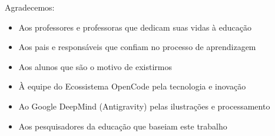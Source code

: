 \documentclass{alfabetizar}
\begin{document}
Agradecemos:
\begin{itemize}[leftmargin=2cm]
  \item Aos professores e professoras que dedicam suas vidas à educação
  \item Aos pais e responsáveis que confiam no processo de aprendizagem
  \item Aos alunos que são o motivo de existirmos
  \item À equipe do Ecossistema OpenCode pela tecnologia e inovação
  \item Ao Google DeepMind (Antigravity) pelas ilustrações e processamento
  \item Aos pesquisadores da educação que baseiam este trabalho
\end{itemize}
\clearpage

\tableofcontents
\clearpage










\end{document}
